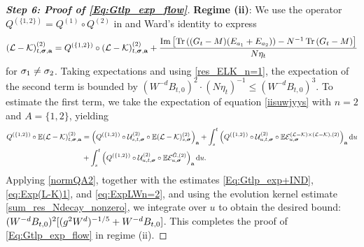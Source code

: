 \begin{proof}[\bf Step 6: Proof of \eqref{Eq:Gtlp_exp_flow}]
\noindent
\textbf{Regime (ii)}: We use the operator $Q^{(\{1,2\})}=Q^{(1)}\circ Q^{(2)}$ in  and Ward's identity to express 
\begin{align}
 (\mathcal L-\mathcal K)_{t,{\boldsymbol{\sigma}},{\mathbf{a}}}^{(2)}=  Q^{(\{1,2\})} \circ (\mathcal L-\mathcal K)_{t,{\boldsymbol{\sigma}},{\mathbf{a}}}^{(2)}  + \frac{\operatorname{{\mathrm{Im}}} \left[{\operatorname{Tr}\left({(G_t-M)(E_{a_1}+E_{a_2})}\right) -N^{-1}\operatorname{Tr}\left({G_t-M}\right)}\right]}{N\eta_t}
\end{align}
for $\sigma_1\ne \sigma_2$. Taking expectations and using \eqref{res_ELK_n=1}, the expectation of the second term is bounded by $(W^{-d}B_{t,0})^2\cdot (N\eta_t)^{-1}\le (W^{-d}B_{t,0})^3$. To estimate the first term, we take the expectation of equation \eqref{iisuwjyys} with $n=2$ and $A=\{1,2\}$, yielding
\begin{align}\label{iisuwjyys_exp}
Q^{(\{1,2\})}\circ \mathbb{E}(\mathcal{L} - \mathcal{K})^{(2)}_{t, {\boldsymbol{\sigma}}, {\mathbf{a}}} 
&=\left(Q^{(\{1,2\})}\circ\mathcal{U}^{(2)}_{s, t, {\boldsymbol{\sigma}}}  \circ \mathbb{E}(\mathcal{L} - \mathcal{K})^{(2)}_{s, {\boldsymbol{\sigma}}}\right)_{{\mathbf{a}}} + \int_{s}^t \left(Q^{(\{1,2\})}\circ \mathcal{U}^{(2)}_{u, t, {\boldsymbol{\sigma}}}  \circ \mathbb{E} \mathcal{E}^{(\mathcal L-\mathcal K)\times(\mathcal L-\mathcal K),(2)}_{u, {\boldsymbol{\sigma}}}\right)_{{\mathbf{a}}} \mathrm{d} u \nonumber\\
& + \int_{s}^t \left(Q^{(\{1,2\})}\circ \mathcal{U}^{(2)}_{u, t, {\boldsymbol{\sigma}}} \circ \mathbb{E}\mathcal{E}^{{\mathring G},(2)}_{u, {\boldsymbol{\sigma}}}\right)_{{\mathbf{a}}} \mathrm{d} u .
\end{align}
Applying \eqref{normQA2}, together with the estimates \eqref{Eq:Gtlp_exp+IND}, \eqref{eq:Exp(L-K)1}, and \eqref{eq:ExpLWn=2}, and using the evolution kernel estimate \eqref{sum_res_Ndecay_nonzero}, we integrate over $u$ to obtain the desired bound: $(W^{-d}B_{t,0})^{2}[(g^2W^d)^{-1/5}+W^{-d}B_{t,0}]$. This completes the proof of \eqref{Eq:Gtlp_exp_flow} in regime (ii).
\end{proof}



 








 